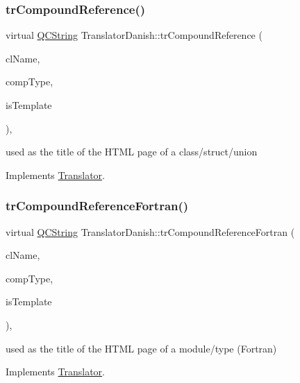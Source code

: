 \subsubsection{\texorpdfstring{trCompoundReference()}{trCompoundReference()}}
{\footnotesize\ttfamily virtual \mbox{\hyperlink{class_q_c_string}{Q\+C\+String}} Translator\+Danish\+::tr\+Compound\+Reference (\begin{DoxyParamCaption}\item[{const char $\ast$}]{cl\+Name,  }\item[{\mbox{\hyperlink{class_class_def_ae70cf86d35fe954a94c566fbcfc87939}{Class\+Def\+::\+Compound\+Type}}}]{comp\+Type,  }\item[{bool}]{is\+Template }\end{DoxyParamCaption})\hspace{0.3cm}{\ttfamily [inline]}, {\ttfamily [virtual]}}

used as the title of the H\+T\+ML page of a class/struct/union 

Implements \mbox{\hyperlink{class_translator}{Translator}}.

\mbox{\label{class_translator_danish_a0f924fbeca4d1a4011cd7eea2a65a5db}} 
\subsubsection{\texorpdfstring{trCompoundReferenceFortran()}{trCompoundReferenceFortran()}}
{\footnotesize\ttfamily virtual \mbox{\hyperlink{class_q_c_string}{Q\+C\+String}} Translator\+Danish\+::tr\+Compound\+Reference\+Fortran (\begin{DoxyParamCaption}\item[{const char $\ast$}]{cl\+Name,  }\item[{\mbox{\hyperlink{class_class_def_ae70cf86d35fe954a94c566fbcfc87939}{Class\+Def\+::\+Compound\+Type}}}]{comp\+Type,  }\item[{bool}]{is\+Template }\end{DoxyParamCaption})\hspace{0.3cm}{\ttfamily [inline]}, {\ttfamily [virtual]}}

used as the title of the H\+T\+ML page of a module/type (Fortran) 

Implements \mbox{\hyperlink{class_translator}{Translator}}.

